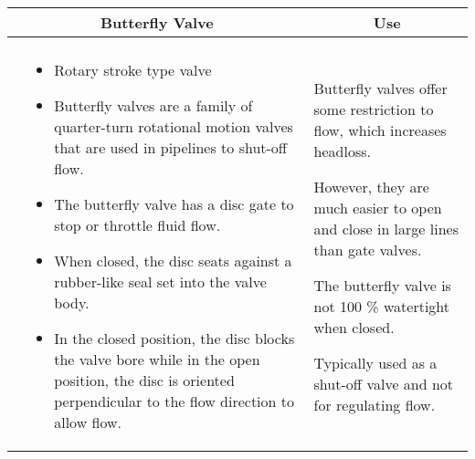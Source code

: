\newpage
\thispagestyle{empty}
\begin{landscape}

   \vspace{-2em} 
\begin{table}
  \centering
  \begin{tabular}{| m{7cm} m{10cm} | m{7cm} | }
    \hline
\multicolumn{2}{c}{Butterfly Valve} & \multicolumn{1}{c}{Use} \\ \hline
    \begin{minipage}{.5\textwidth}
    \begin{center}
     \texttt{[image: ButterflyValve1]}\\
     \end{center}
    \end{minipage}
    &
  \scriptsize{\begin{itemize}[topsep=5pt, partopsep=0pt]
  \item Rotary stroke type valve \item Butterfly valves are a family of quarter-turn rotational motion valves that are used in pipelines to shut-off flow. \item The butterfly valve has a disc gate to stop or throttle fluid flow.   \item When closed, the disc seats against a rubber-like seal set into the valve body.  \item In the closed position, the disc blocks the valve bore while in the open position, the disc is oriented perpendicular to the flow direction to allow flow.
  \end{itemize}}  
    &
      \begin{itemize}[leftmargin=*]
      \scriptsize{
        \item Butterfly valves offer some restriction to flow, which increases headloss. \item However, they are much easier to open and close in large lines than gate valves. \item The butterfly valve is not 100 \% watertight when closed.  \item Typically used as a shut-off valve and not for regulating flow.}
      \end{itemize}
  
    \\ \hline


\end{tabular}
\end{table}
\end{landscape}
